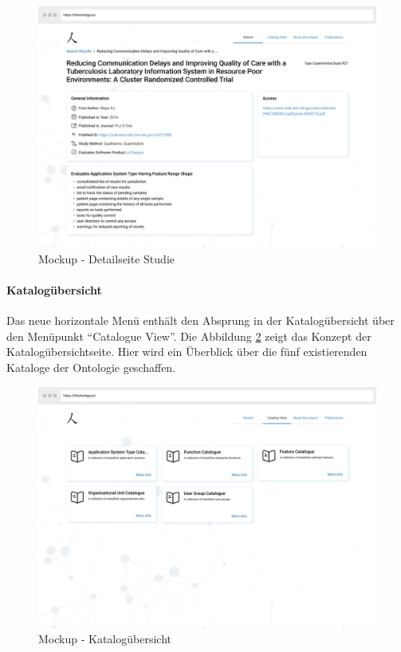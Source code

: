 \begin{figure}[H]
	\centering
    	\includegraphics[width=\textwidth]{Images/Studie_Detailseite}
   	\caption{Mockup - Detailseite Studie}
   	\label{fig:mockup_study_detail}
\end{figure}

\paragraph{Katalogübersicht}

Das neue horizontale Menü enthält den Absprung in der Katalogübersicht über den Menüpunkt \enquote{Catalogue View}.
Die Abbildung \ref{fig:mockup_catalogue_overview} zeigt das Konzept der Katalogübersichtseite.
Hier wird ein Überblick über die fünf existierenden Kataloge der Ontologie geschaffen.

\begin{figure}[H]
	\centering
    	\includegraphics[width=\textwidth]{Images/Katalog_Uebersicht}
   	\caption{Mockup - Katalogübersicht}
   	\label{fig:mockup_catalogue_overview}
\end{figure}

